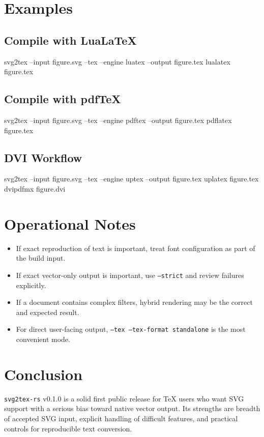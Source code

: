 \documentclass[11pt,a4paper]{article}
\begin{document}
\section{Examples}

\subsection{Compile with LuaLaTeX}

\begin{codeblock}
svg2tex --input figure.svg --tex --engine luatex --output figure.tex
lualatex figure.tex
\end{codeblock}

\subsection{Compile with pdfTeX}

\begin{codeblock}
svg2tex --input figure.svg --tex --engine pdftex --output figure.tex
pdflatex figure.tex
\end{codeblock}

\subsection{DVI Workflow}

\begin{codeblock}
svg2tex --input figure.svg --tex --engine uptex --output figure.tex
uplatex figure.tex
dvipdfmx figure.dvi
\end{codeblock}

\section{Operational Notes}

\begin{itemize}
\item If exact reproduction of text is important, treat font configuration as part of the build input.
\item If exact vector-only output is important, use \texttt{--strict} and review failures explicitly.
\item If a document contains complex filters, hybrid rendering may be the correct and expected result.
\item For direct user-facing output, \texttt{--tex --tex-format standalone} is the most convenient mode.
\end{itemize}

\section{Conclusion}

\texttt{svg2tex-rs} v0.1.0 is a solid first public release for TeX users who want SVG support with a
serious bias toward native vector output. Its strengths are breadth of accepted SVG input, explicit
handling of difficult features, and practical controls for reproducible text conversion.
\end{document}
